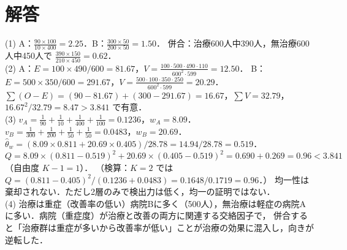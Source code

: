 \documentclass[a4paper,11pt,openany]{ltjsbook}
\newenvironment{kaitou}[1]{%
  \par\medskip\noindent
  \begin{tcolorbox}[enhanced,breakable,colback=bkgray!3,colframe=bkgray!60,boxrule=0.4pt,
    left=4pt,right=4pt,top=2pt,bottom=2pt,arc=1pt,
    title={\cref{#1}の解答},fonttitle=\bfseries\small,coltitle=white,colbacktitle=bkgray!80]}%
  {\end{tcolorbox}\par}
\begin{document}
\section{解答}\label{sec:07-sol}
\begin{kaitou}{reidai:07-1}
(1) A：$\frac{90\times100}{10\times400}=2.25$．B：$\frac{300\times50}{200\times50}=1.50$．
併合：治療600人中390人，無治療600人中450人で $\frac{390\times150}{210\times450}=0.62$．\\
(2) A：$E=100\times490/600=81.67$，$V=\frac{100\cdot500\cdot490\cdot110}{600^2\cdot599}=12.50$．
B：$E=500\times350/600=291.67$，$V=\frac{500\cdot100\cdot350\cdot250}{600^2\cdot599}=20.29$．
$\sum(O-E)=(90-81.67)+(300-291.67)=16.67$，$\sum V=32.79$，$16.67^2/32.79=8.47>3.841$ で有意．\\
(3) $v_A=\frac1{90}+\frac1{10}+\frac1{400}+\frac1{100}=0.1236$，$w_A=8.09$．
$v_B=\frac1{300}+\frac1{200}+\frac1{50}+\frac1{50}=0.0483$，$w_B=20.69$．
$\hat\theta_w=(8.09\times0.811+20.69\times0.405)/28.78=14.94/28.78=0.519$．
$Q=8.09\times(0.811-0.519)^2+20.69\times(0.405-0.519)^2=0.690+0.269=0.96<3.841$（自由度 $K-1=1$）．
（検算：$K=2$ では $Q=(0.811-0.405)^2/(0.1236+0.0483)=0.1648/0.1719=0.96$．）
均一性は棄却されない．ただし2層のみで検出力は低く，均一の証明ではない．\\
(4) 治療は重症（改善率の低い）病院Bに多く（500人），無治療は軽症の病院Aに多い．病院（重症度）が治療と改善の両方に関連する交絡因子で，
併合すると「治療群は重症が多いから改善率が低い」ことが治療の効果に混入し，向きが逆転した．
\end{kaitou}
\end{document}
